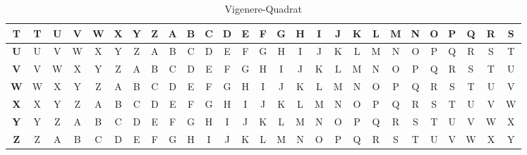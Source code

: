 \begin{table}[H]
\begin{tabular}{|c||c|c|c|c|c|c|c|c|c|c|c|c|c|c|c|c|c|c|c|c|c|c|c|c|c|c|}
						\textbf{T} & T          & U          & V          & W          & X          & Y          & Z          & A          & B          & C          & D          & E          & F          & G          & H          & I          & J          & K          & L          & M          & N          & O          & P          & Q          & R          & S          \\ \hline
						\textbf{U} & U          & V          & W          & X          & Y          & Z          & A          & B          & C          & D          & E          & F          & G          & H          & I          & J          & K          & L          & M          & N          & O          & P          & Q          & R          & S          & T          \\ \hline
						\textbf{V} & V          & W          & X          & Y          & Z          & A          & B          & C          & D          & E          & F          & G          & H          & I          & J          & K          & L          & M          & N          & O          & P          & Q          & R          & S          & T          & U          \\ \hline
						\textbf{W} & W          & X          & Y          & Z          & A          & B          & C          & D          & E          & F          & G          & H          & I          & J          & K          & L          & M          & N          & O          & P          & Q          & R          & S          & T          & U          & V          \\ \hline
						\textbf{X} & X          & Y          & Z          & A          & B          & C          & D          & E          & F          & G          & H          & I          & J          & K          & L          & M          & N          & O          & P          & Q          & R          & S          & T          & U          & V          & W          \\ \hline
						\textbf{Y} & Y          & Z          & A          & B          & C          & D          & E          & F          & G          & H          & I          & J          & K          & L          & M          & N          & O          & P          & Q          & R          & S          & T          & U          & V          & W          & X          \\ \hline
						\textbf{Z} & Z          & A          & B          & C          & D          & E          & F          & G          & H          & I          & J          & K          & L          & M          & N          & O          & P          & Q          & R          & S          & T          & U          & V          & W          & X          & Y          \\ \hline
					\end{tabular}
					\caption{Vigenere-Quadrat}
				\end{table}

